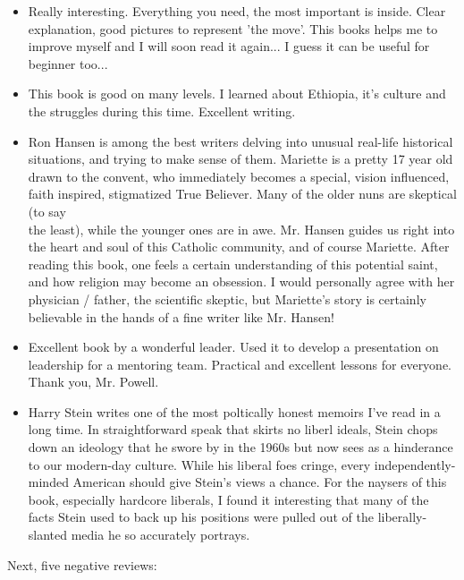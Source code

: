 \documentclass[11pt,openany,executivepaper]{book}
\begin{document}
\begin{itemize}
  \item Really interesting. Everything you need, the most important is inside. Clear explanation, good pictures to represent 'the move'. This books helps me to improve myself and I will soon read it again... I guess it can be useful for beginner too...
  \item This book is good on many levels. I learned about Ethiopia, it's culture and the struggles during this time. Excellent writing.
  \item Ron Hansen is among the best writers delving into unusual real-life historical situations, and trying to make sense of them. Mariette is a pretty 17 year old drawn to the convent, who immediately becomes a special, vision influenced, faith inspired, stigmatized True Believer. Many of the older nuns are skeptical (to say\\
the least), while the younger ones are in awe. Mr. Hansen guides us right into the heart and soul of this Catholic community, and of course Mariette. After reading this book, one feels a certain understanding of this potential saint, and how religion may become an obsession. I would personally agree with her physician / father, the scientific skeptic, but Mariette's story is certainly believable in the hands of a fine writer like Mr. Hansen!
  \item Excellent book by a wonderful leader. Used it to develop a presentation on leadership for a mentoring team. Practical and excellent lessons for everyone. Thank you, Mr. Powell.
  \item Harry Stein writes one of the most poltically honest memoirs I've read in a long time. In straightforward speak that skirts no liberl ideals, Stein chops down an ideology that he swore by in the 1960s but now sees as a hinderance to our modern-day culture. While his liberal foes cringe, every independently-minded American should give Stein's views a chance. For the naysers of this book, especially hardcore liberals, I found it interesting that many of the facts Stein used to back up his positions were pulled out of the liberally-slanted media he so accurately portrays.
\end{itemize}

Next, five negative reviews:
\end{document}
